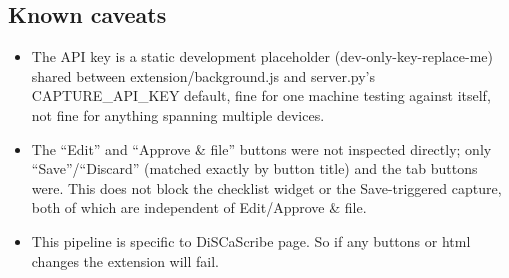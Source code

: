 \documentclass[11pt,a4paper]{article}
\begin{document}
\subsection{Known caveats}

\begin{itemize}
  \item The API key is a static development placeholder
  (dev-only-key-replace-me) shared between
  extension/background.js and server.py's
  CAPTURE\_API\_KEY default, fine for one machine testing against
  itself, not fine for anything spanning multiple devices.
  
  \item The ``Edit'' and ``Approve \& file'' buttons were not inspected
  directly; only ``Save''/``Discard'' (matched exactly by button title) and
  the tab buttons were. This does not block the checklist widget or the
  Save-triggered capture, both of which are independent of Edit/Approve \&
  file.
  
  \item This pipeline is specific to DiSCaScribe page. So if any buttons or html changes the extension will fail.
  
\end{itemize}
\end{document}
